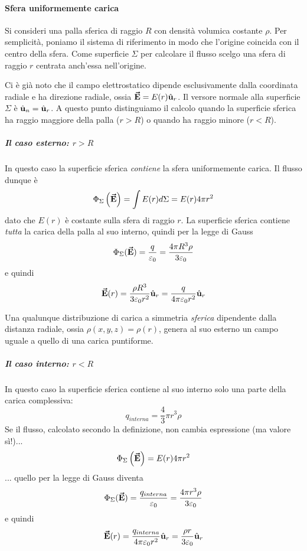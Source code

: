 \paragraph{Sfera uniformemente carica}
Si consideri una palla sferica di raggio $R$ con densità volumica costante $\rho$. Per semplicità, poniamo il sistema di riferimento in modo che l'origine coincida con il centro della sfera. Come superficie $\Sigma$ per calcolare il flusso scelgo una sfera di raggio $r$ centrata anch'essa nell'origine.

Ci è già noto che il campo elettrostatico dipende esclusivamente dalla coordinata radiale e ha direzione radiale, ossia $\vb*{\va{E}}=E(r)\hat{\mathbf{u}}_r$. Il versore normale alla superficie $\Sigma$ è $\hat{\mathbf{u}}_n=\hat{\mathbf{u}}_r$.
A questo punto distinguiamo il calcolo quando la superficie sferica ha raggio maggiore della palla ($r>R$) o quando ha raggio minore ($r<R$).
\subparagraph{Il caso esterno: $r>R$}
In questo caso la superficie sferica \textit{contiene} la sfera uniformemente carica. Il flusso dunque è
\begin{equation*}
	\Phi_{\Sigma}\left(\vb*{\va{E}}\right)=\int E(r)d\Sigma=E(r)4\pi r^2
\end{equation*}
dato che $E(r)$ è costante sulla sfera di raggio $r$.
La superficie sferica contiene \textit{tutta} la carica della palla al suo interno, quindi per la legge di Gauss
\begin{equation*}
	\Phi_{\Sigma}(\vb*{\va{E}})=\frac{q}{\varepsilon_0}=\frac{4 \pi R^3\rho}{3\varepsilon_0}
\end{equation*}
e quindi
\begin{equation}
	\vb*{\va{E}}(r)=\frac{\rho R^3}{3\varepsilon_0r^2}\hat{\mathbf{u}}_r=\frac{q}{4\pi\varepsilon_0 r^2}\hat{\mathbf{u}}_r
\end{equation}
\begin{observe}
	Una qualunque distribuzione di carica a simmetria \textit{sferica} dipendente dalla distanza radiale, ossia $\rho(x,y,z)=\rho(r)$, genera al suo esterno un campo uguale a quello di una carica puntiforme.
\end{observe}
\subparagraph{Il caso interno: $r<R$}
In questo caso la superficie sferica contiene al suo interno solo una parte della carica complessiva:
\begin{equation*}
	q_{interna}=\frac{4}{3}\pi r^3\rho
\end{equation*}
Se il flusso, calcolato secondo la definizione, non cambia espressione (ma valore sì!)...
\begin{equation*}
	\Phi_{\Sigma}\left(\vb*{\va{E}}\right)=E(r)4\pi r^2
\end{equation*}
... quello per la legge di Gauss diventa
\begin{equation*}
	\Phi_{\Sigma}(\vb*{\va{E}})=\frac{q_{interna}}{\varepsilon_0}=\frac{4 \pi r^3\rho}{3\varepsilon_0}
\end{equation*}
e quindi
\begin{equation}
\vb*{\va{E}}(r)=\frac{q_{interna}}{4\pi\varepsilon_0 r^2}\hat{\mathbf{u}}_r=\frac{\rho r}{3\varepsilon_0}\hat{\mathbf{u}}_r
\end{equation}

